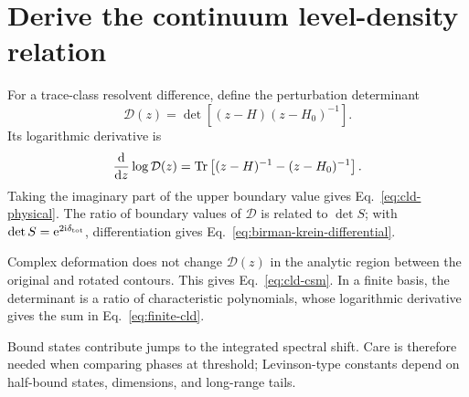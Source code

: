 \section{Derive the continuum level-density relation}
\label{app:cld-derivation}

For a trace-class resolvent difference, define the perturbation determinant
\begin{equation}
  \mathcal D(z)
  =\det\left[(z-H)(z-H_0)^{-1}\right] .
  \label{eq:perturbation-determinant}
\end{equation}
Its logarithmic derivative is
\begin{equation}
  \frac{\mathrm{d}}{\mathrm{d} z}\log\mathcal D(z)
  =\operatorname{Tr}\left[(z-H)^{-1}-(z-H_0)^{-1}\right] .
  \label{eq:determinant-resolvent-trace}
\end{equation}
Taking the imaginary part of the upper boundary value gives
Eq.~\eqref{eq:cld-physical}.  The ratio of boundary values of
$\mathcal D$ is related to $\det S$; with
$\det S=\mathrm{e}^{2\mathrm{i}\delta_{\mathrm{tot}}}$, differentiation gives
Eq.~\eqref{eq:birman-krein-differential}.

Complex deformation does not change $\mathcal D(z)$ in the analytic region
between the original and rotated contours.  This gives
Eq.~\eqref{eq:cld-csm}.  In a finite basis, the determinant is a ratio of
characteristic polynomials, whose logarithmic derivative gives the sum in
Eq.~\eqref{eq:finite-cld}.

Bound states contribute jumps to the integrated spectral shift.  Care is
therefore needed when comparing phases at threshold; Levinson-type constants
depend on half-bound states, dimensions, and long-range tails.
